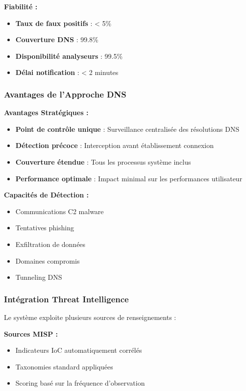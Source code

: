\textbf{Fiabilité :}
\begin{itemize}
    \item \textbf{Taux de faux positifs} : < 5\%
    \item \textbf{Couverture DNS} : 99.8\%
    \item \textbf{Disponibilité analyseurs} : 99.5\%
    \item \textbf{Délai notification} : < 2 minutes
\end{itemize}

\subsubsection{Avantages de l'Approche DNS}

\textbf{Avantages Stratégiques :}
\begin{itemize}
    \item \textbf{Point de contrôle unique} : Surveillance centralisée des résolutions DNS
    \item \textbf{Détection précoce} : Interception avant établissement connexion
    \item \textbf{Couverture étendue} : Tous les processus système inclus
    \item \textbf{Performance optimale} : Impact minimal sur les performances utilisateur
\end{itemize}

\textbf{Capacités de Détection :}
\begin{itemize}
    \item Communications C2 malware
    \item Tentatives phishing
    \item Exfiltration de données
    \item Domaines compromis
    \item Tunneling DNS
\end{itemize}

\subsubsection{Intégration Threat Intelligence}

Le système exploite plusieurs sources de renseignements :

\textbf{Sources MISP :}
\begin{itemize}
    \item Indicateurs IoC automatiquement corrélés
    \item Taxonomies standard appliquées
    \item Scoring basé sur la fréquence d'observation
\end{itemize}

